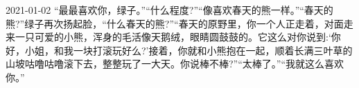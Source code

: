 \begin{diary}{2021-01-02}
    “最最喜欢你，绿子。”“什么程度?”“像喜欢春天的熊一样。”“春天的熊?”绿子再次扬起脸，“什么春天的熊?”“春天的原野里，你一个人正走着，对面走来一只可爱的小熊，浑身的毛活像天鹅绒，眼睛圆鼓鼓的。它这么对你说到:‘你好，小姐，和我一块打滚玩好么?’接着，你就和小熊抱在一起，顺着长满三叶草的山坡咕噜咕噜滚下去，整整玩了一大天。你说棒不棒?”“太棒了。”“我就这么喜欢你。”
\end{diary}